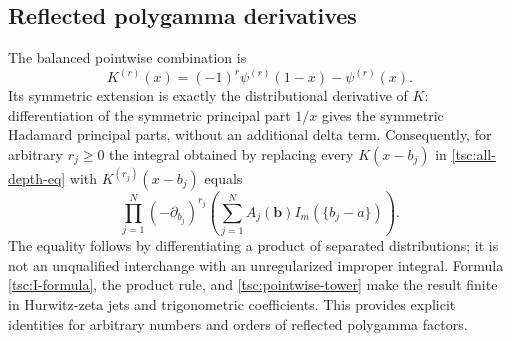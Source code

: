 \subsection{Reflected polygamma derivatives}
The balanced pointwise combination is
\begin{equation}\label{tsc:reflected-poly}
 K^{(r)}(x)=(-1)^r\psi^{(r)}(1-x)-\psi^{(r)}(x).
\end{equation}
Its symmetric extension is exactly the distributional derivative of $K$:
differentiation of the symmetric principal part $1/x$ gives the symmetric
Hadamard principal parts, without an additional delta term. Consequently,
for arbitrary $r_j\ge0$ the integral obtained by replacing every
$K(x-b_j)$ in \eqref{tsc:all-depth-eq} with $K^{(r_j)}(x-b_j)$ equals
\begin{equation}\label{tsc:reflected-derivatives}
 \prod_{j=1}^N(-\partial_{b_j})^{r_j}
           \left(\sum_{j=1}^NA_j(\mathbf b)I_m(\{b_j-a\})\right).
\end{equation}
The equality follows by differentiating a product of separated distributions;
it is not an unqualified interchange with an unregularized improper integral.
Formula \eqref{tsc:I-formula}, the product rule, and
\eqref{tsc:pointwise-tower} make the result finite in Hurwitz-zeta jets and
trigonometric coefficients. This provides explicit identities for arbitrary
numbers and orders of reflected polygamma factors.

